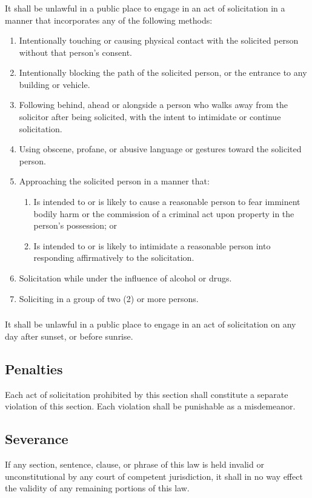 \subsubsection{}
It shall be unlawful in a public place to engage in an act of solicitation in a manner that incorporates any of the following methods:
\begin{enumerate}[{\indent}a)]
    \item Intentionally touching or causing physical contact with the solicited person without that person’s consent.
    \item Intentionally blocking the path of the solicited person, or the entrance to any building or vehicle.
    \item Following behind, ahead or alongside a person who walks away from the solicitor after being solicited, with the intent to intimidate or continue solicitation.
    \item Using obscene, profane, or abusive language or gestures toward the solicited person.
    \item Approaching the solicited person in a manner that:
        \begin{enumerate}[{\indent}i)]
            \item Is intended to or is likely to cause a reasonable person to fear imminent bodily harm or the commission of a criminal act upon property in the person’s possession; or
            \item Is intended to or is likely to intimidate a reasonable person into responding affirmatively to the solicitation.
        \end{enumerate}
    \item Solicitation while under the influence of alcohol or drugs.
    \item Soliciting in a group of two (2) or more persons.
\end{enumerate}
\subsubsection{}
It shall be unlawful in a public place to engage in an act of solicitation on any day after sunset, or before sunrise.
\subsection{Penalties}
Each act of solicitation prohibited by this section shall constitute a separate violation of this section.  Each violation shall be punishable as a misdemeanor.
\subsection{Severance}
If any section, sentence, clause, or phrase of this law is held invalid or unconstitutional by any court of competent jurisdiction, it shall in no way effect the validity of any remaining portions of this law.
